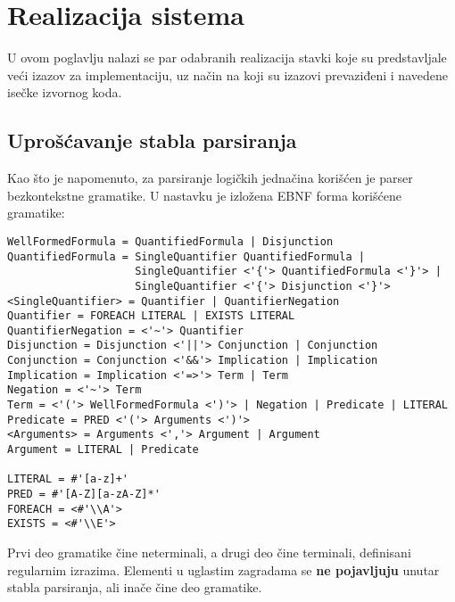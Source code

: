 \chapter{Realizacija sistema}\label{realizacija}
U ovom poglavlju nalazi se par odabranih realizacija stavki koje su predstavljale veći izazov za implementaciju, uz način na koji su izazovi prevaziđeni i navedene isečke izvornog koda.

\section{Uprošćavanje stabla parsiranja}
Kao što je napomenuto, za parsiranje logičkih jednačina korišćen je parser bezkontekstne gramatike. U nastavku je izložena EBNF forma korišćene gramatike:
\begin{verbatim}
WellFormedFormula = QuantifiedFormula | Disjunction
QuantifiedFormula = SingleQuantifier QuantifiedFormula |
                    SingleQuantifier <'{'> QuantifiedFormula <'}'> |
                    SingleQuantifier <'{'> Disjunction <'}'>
<SingleQuantifier> = Quantifier | QuantifierNegation
Quantifier = FOREACH LITERAL | EXISTS LITERAL
QuantifierNegation = <'~'> Quantifier
Disjunction = Disjunction <'||'> Conjunction | Conjunction
Conjunction = Conjunction <'&&'> Implication | Implication
Implication = Implication <'=>'> Term | Term
Negation = <'~'> Term
Term = <'('> WellFormedFormula <')'> | Negation | Predicate | LITERAL
Predicate = PRED <'('> Arguments <')'>
<Arguments> = Arguments <','> Argument | Argument
Argument = LITERAL | Predicate

LITERAL = #'[a-z]+'
PRED = #'[A-Z][a-zA-Z]*'
FOREACH = <#'\\A'>
EXISTS = <#'\\E'>
\end{verbatim}
Prvi deo gramatike čine neterminali, a drugi deo čine terminali, definisani regularnim izrazima. Elementi u uglastim zagradama se \textbf{ne pojavljuju} unutar stabla parsiranja, ali inače čine deo gramatike.

